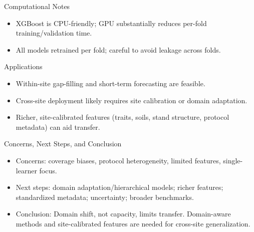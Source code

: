 \documentclass{beamer}
\begin{document}
\begin{frame}{Computational Notes}
  \begin{itemize}
    \item XGBoost is CPU-friendly; GPU substantially reduces per-fold training/validation time.
    \item All models retrained per fold; careful to avoid leakage across folds.
  \end{itemize}
\end{frame}

\begin{frame}{Applications}
  \begin{itemize}
    \item Within-site gap-filling and short-term forecasting are feasible.
    \item Cross-site deployment likely requires site calibration or domain adaptation.
    \item Richer, site-calibrated features (traits, soils, stand structure, protocol metadata) can aid transfer.
  \end{itemize}
\end{frame}

\begin{frame}{Concerns, Next Steps, and Conclusion}
  \begin{itemize}
    \item Concerns: coverage biases, protocol heterogeneity, limited features, single-learner focus.
    \item Next steps: domain adaptation/hierarchical models; richer features; standardized metadata; uncertainty; broader benchmarks.
    \item Conclusion: Domain shift, not capacity, limits transfer. Domain-aware methods and site-calibrated features are needed for cross-site generalization.
  \end{itemize}
\end{frame}
\end{document}
